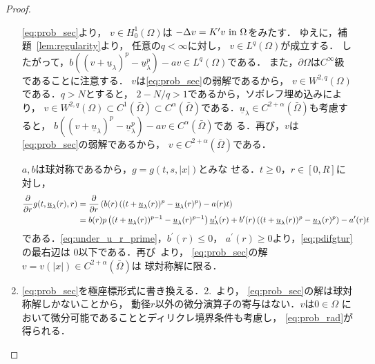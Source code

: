 \begin{proof}
\begin{enumerate}[1.]
        \ref{eq:prob_sec}より，
        $v \in H_0^1(\Omega)$は
        $- \Delta v = K^\prime v ~\text{in}~ \Omega$をみたす．
        ゆえに，補題~\ref{lem:regularity}より，
        任意の$q < \infty$に対し，
        $v \in L^q(\Omega)$が成立する．
        したがって，$b \left( (v+ \underline{u}_\lambda)^p -
        \underline{u}_\lambda^p \right) - av \in L^q(\Omega)$である．
        また，$\partial \Omega$は$C^\infty$級であることに注意する．
        $v$は\ref{eq:prob_sec}の弱解であるから，
        $v \in W^{2, q}(\Omega)$である．$q > N$とすると，
        $2 - N /q > 1$であるから，ソボレフ埋め込みにより，
        $v \in W^{2, q}(\Omega) \subset C^1(\bar{\Omega}) \subset
        C^\alpha(\bar{\Omega})$である．$\underline{u}_\lambda \in C^{2 +
        \alpha}(\bar{\Omega})$も考慮すると，
        $b \left( (v+ \underline{u}_\lambda)^p -
        \underline{u}_\lambda^p \right) - av \in C^\alpha
        (\bar{\Omega})$であ
        る．再び，$v$は\ref{eq:prob_sec}の弱解であるから，
        $v \in C^{2+\alpha}(\bar{\Omega})$である．
        
        $a, b$は球対称であるから，$g = g(t, s, \lvert x \rvert)$とみな
        せる．$t \geq 0$，$r \in [0, R]$に対し，
        \begin{align}
         \frac{\partial }{\partial r} g(t, \underline{u}_\lambda(r), r)
         &= \frac{\partial }{\partial r} \left( b(r) \left( (t + \underline{u}
         _\lambda(r))^p -
         \underline{u}_\lambda(r)^p \right) - a(r) t \right) \notag \\
         &= b(r) p \left( (t+ \underline{u}_\lambda(r))^{p-1} -
         \underline{u}_\lambda(r)^{p-1} \right)
         \underline{u}_\lambda^\prime(r) + b^\prime(r) \left( (t +
         \underline{u}_\lambda(r))^p  - \underline{u}_\lambda(r)^p
         \right) - a^\prime(r) t \label{eq:pdifgtur}
        \end{align}
        である．\eqref{eq:under_u_r_prime}，$b^\prime(r) \leq 0$，
        $a^\prime(r) \geq 0$より，\eqref{eq:pdifgtur}の最右辺は
        $0$以下である．再び\cite{MR544879}~より，
        \ref{eq:prob_sec}の解
        $v = v(\lvert x \rvert) \in C^{2+\alpha}(\bar{\Omega})$は
        球対称解に限る．
  \item \ref{eq:prob_sec}を極座標形式に書き換える．2.~より，
        \ref{eq:prob_sec}の解は球対称解しかないことから，
        動径$r$以外の微分演算子の寄与はない．$v$は$0 \in \Omega$
        において微分可能であることとディリクレ境界条件も考慮し，
        \eqref{eq:prob_rad}が得られる．\qedhere
 \end{enumerate}
\end{proof}

